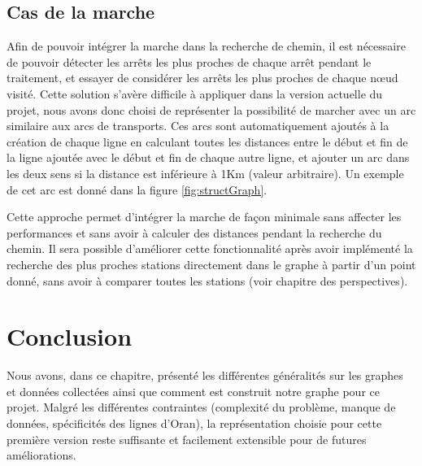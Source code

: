 \subsection{Cas de la marche}
Afin de pouvoir intégrer la marche dans la recherche de chemin, il est nécessaire de pouvoir détecter les arrêts les plus proches de chaque arrêt pendant le traitement, et essayer de considérer les arrêts les plus proches de chaque nœud visité.\newline 
Cette solution s'avère difficile à appliquer dans la version actuelle du projet, nous avons donc choisi de représenter la possibilité de marcher avec un arc similaire aux arcs de transports.\newline
Ces arcs sont automatiquement ajoutés à la création de chaque ligne en calculant toutes les distances entre le début et fin de la ligne ajoutée avec le début et fin de chaque autre ligne, et ajouter un arc dans les deux sens si la distance est inférieure à 1Km (valeur arbitraire).
Un exemple de cet arc est donné dans la figure \ref{fig:structGraph}.

Cette approche permet d'intégrer la marche de façon minimale sans affecter les performances et sans avoir à calculer des distances pendant la recherche du chemin.
Il sera possible d'améliorer cette fonctionnalité après avoir implémenté la recherche des plus proches stations directement dans le graphe à partir d'un point donné, sans avoir à comparer toutes les stations (voir chapitre des perspectives).

\section{Conclusion}
Nous avons, dans ce chapitre, présenté les différentes généralités sur les graphes et données collectées ainsi que comment est construit notre graphe pour ce projet.
Malgré les différentes contraintes (complexité du problème, manque de données, spécificités des lignes d'Oran), la représentation choisie pour cette première version reste suffisante et facilement extensible pour de futures améliorations.
\newpage
